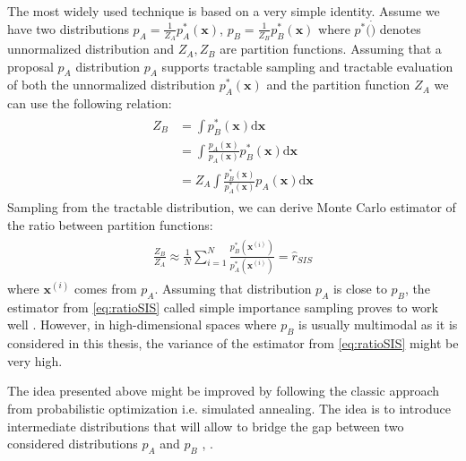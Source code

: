 \documentclass[../report/report.tex]{subfiles}
\begin{document}
The most widely used technique is based on a very simple identity. Assume we have two distributions $p_A= \frac{1}{Z_A}p_A^*(\mathbf{x})$, $p_B= \frac{1}{Z_B}p_B^*(\mathbf{x})$ where $p^*(\dot)$ denotes unnormalized distribution and $Z_A, Z_B$ are partition functions. Assuming that a proposal $p_A$ distribution $p_A$ supports tractable sampling and tractable evaluation of both the unnormalized distribution $p_A^*(\mathbf{x})$ and the partition function $Z_A$ we can use the following relation:
\begin{align}
\begin{split}
Z_B & = \int p^*_B(\mathbf{x}) \text{d} \mathbf{x} \\ 
 &= \int \frac{p_A(\mathbf{x})}{p_A(\mathbf{x})} p^*_B(\mathbf{x}) \text{d} \mathbf{x}\\
 &=  Z_A \int \frac{ p^*_B(\mathbf{x}) }{ p^*_A(\mathbf{x}) }p_A(\mathbf{x})  \text{d} \mathbf{x} 
\end{split}
\end{align}
Sampling from the tractable distribution, we can derive Monte Carlo estimator of the ratio between partition functions:
\begin{align}
\begin{split}
\frac{Z_B}{Z_A} \approx \frac{1}{N} \sum_{i=1}^N \frac{ p^*_B(\mathbf{x}^{(i)}) }{ p^*_A(\mathbf{x}^{(i)}) } = \hat{r}_{SIS}
\label{eq:ratioSIS}
\end{split}
\end{align}
where $\mathbf{x}^{(i)}$ comes from $p_A$.
Assuming that distribution $p_A$ is close to $p_B$, the estimator from  \ref{eq:ratioSIS} called simple importance sampling proves to work well \cite{minka2005divergence}. However, in high-dimensional spaces where $p_B$ is usually multimodal as it is considered in this thesis, the variance of the estimator from \ref{eq:ratioSIS} might be very high. 

The idea presented above might be improved by following the classic approach  from probabilistic optimization i.e. simulated annealing. The idea is to introduce intermediate distributions that will allow to bridge the gap between two considered distributions $p_A$ and $p_B$ \cite{jarzynski1997nonequilibrium}, \cite{neal2001annealed}.
\end{document}
